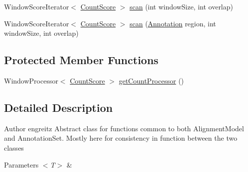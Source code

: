 \begin{DoxyCompactItemize}
\item 
Window\+Score\+Iterator$<$ \hyperlink{classumms_1_1core_1_1model_1_1score_1_1_count_score}{Count\+Score} $>$ \hyperlink{classumms_1_1core_1_1annotation_1_1_abstract_annotation_collection_3_01_t_01extends_01_annotation_01_4_ad5e4df7215f9fd180242b6d9b1b8a930}{scan} (int window\+Size, int overlap)
\item 
Window\+Score\+Iterator$<$ \hyperlink{classumms_1_1core_1_1model_1_1score_1_1_count_score}{Count\+Score} $>$ \hyperlink{classumms_1_1core_1_1annotation_1_1_abstract_annotation_collection_3_01_t_01extends_01_annotation_01_4_a8c6c8a621a6e2ffca209230cbf844d98}{scan} (\hyperlink{interfaceumms_1_1core_1_1annotation_1_1_annotation}{Annotation} region, int window\+Size, int overlap)
\end{DoxyCompactItemize}
\subsection*{Protected Member Functions}
\begin{DoxyCompactItemize}
\item 
Window\+Processor$<$ \hyperlink{classumms_1_1core_1_1model_1_1score_1_1_count_score}{Count\+Score} $>$ \hyperlink{classumms_1_1core_1_1annotation_1_1_abstract_annotation_collection_3_01_t_01extends_01_annotation_01_4_a7e1567b53456c524612b5046601b7d3a}{get\+Count\+Processor} ()
\end{DoxyCompactItemize}


\subsection{Detailed Description}
\begin{DoxyAuthor}{Author}
engreitz Abstract class for functions common to both Alignment\+Model and Annotation\+Set. Mostly here for consistency in function between the two classes 
\end{DoxyAuthor}

\begin{DoxyParams}{Parameters}
{\em $<$\+T$>$} & \\
\hline
\end{DoxyParams}


